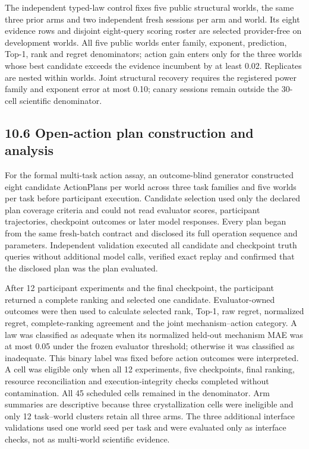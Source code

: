 \documentclass[10pt,twocolumn]{article}
\begin{document}
The independent typed-law control fixes five public structural worlds,
the same three prior arms and two independent fresh sessions per arm and
world. Its eight evidence rows and disjoint eight-query scoring roster
are selected provider-free on development worlds. All five public worlds
enter family, exponent, prediction, Top-1, rank and regret denominators;
action gain enters only for the three worlds whose best candidate
exceeds the evidence incumbent by at least 0.02. Replicates are nested
within worlds. Joint structural recovery requires the registered power
family and exponent error at most 0.10; canary sessions remain outside
the 30-cell scientific denominator.

\subsection{10.6 Open-action plan construction and
analysis}\label{open-action-plan-construction-and-analysis}

For the formal multi-task action assay, an outcome-blind generator
constructed eight candidate ActionPlans per world across three task
families and five worlds per task before participant execution.
Candidate selection used only the declared plan coverage criteria and
could not read evaluator scores, participant trajectories, checkpoint
outcomes or later model responses. Every plan began from the same
fresh-batch contract and disclosed its full operation sequence and
parameters. Independent validation executed all candidate and checkpoint
truth queries without additional model calls, verified exact replay and
confirmed that the disclosed plan was the plan evaluated.

After 12 participant experiments and the final checkpoint, the
participant returned a complete ranking and selected one candidate.
Evaluator-owned outcomes were then used to calculate selected rank,
Top-1, raw regret, normalized regret, complete-ranking agreement and the
joint mechanism--action category. A law was classified as adequate when
its normalized held-out mechanism MAE was at most 0.05 under the frozen
evaluator threshold; otherwise it was classified as inadequate. This
binary label was fixed before action outcomes were interpreted. A cell
was eligible only when all 12 experiments, five checkpoints, final
ranking, resource reconciliation and execution-integrity checks
completed without contamination. All 45 scheduled cells remained in the
denominator. Arm summaries are descriptive because three crystallization
cells were ineligible and only 12 task--world clusters retain all three
arms. The three additional interface validations used one world seed per
task and were evaluated only as interface checks, not as multi-world
scientific evidence.
\end{document}
